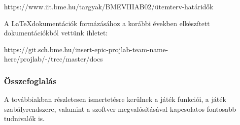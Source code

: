 https://www.iit.bme.hu/targyak/BMEVIIIAB02/ütemterv-határidők

A \LaTeX\hspace{0.5em}dokumentációk formázásához a korábbi években elkészített dokumentációkból vettünk ihletet:

https://git.sch.bme.hu/insert-epic-projlab-team-name-here/projlab/-/tree/master/docs

\subsubsection{Összefoglalás}

A továbbiakban részletesen ismertetésre kerülnek a játék funkciói, a játék szabályrendszere, valamint a szoftver megvalósításával kapcsolatos fontosabb tudnivalók is.
